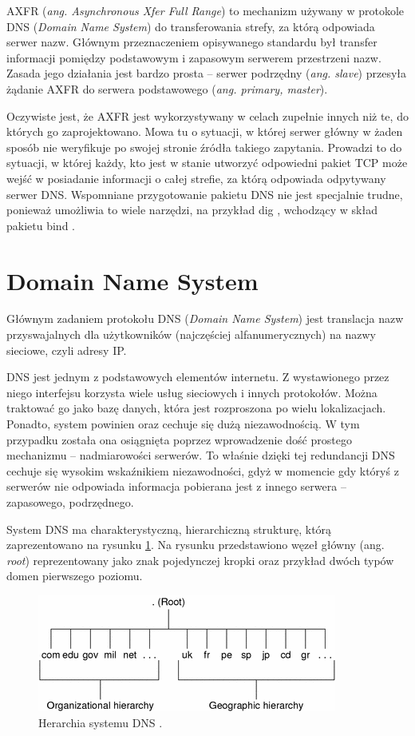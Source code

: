 AXFR (\textit{ang. Asynchronous Xfer Full Range}) \cite{RFC1034, RFC1035} to mechanizm używany w protokole DNS (\textit{Domain Name System}) do
transferowania strefy, za którą odpowiada serwer nazw. Głównym przeznaczeniem opisywanego standardu był transfer informacji pomiędzy
podstawowym i zapasowym serwerem przestrzeni nazw. Zasada jego działania jest bardzo prosta -- serwer podrzędny (\textit{ang. slave})
przesyła żądanie AXFR do serwera podstawowego (\textit{ang. primary, master}).

Oczywiste jest, że AXFR jest wykorzystywany w celach zupełnie innych niż te, do których go zaprojektowano. Mowa tu o sytuacji,
w której serwer główny w żaden sposób nie weryfikuje po swojej stronie źródła takiego zapytania. Prowadzi to do sytuacji, w której
każdy, kto jest w stanie utworzyć odpowiedni pakiet TCP może wejść w posiadanie informacji o całej strefie, za którą odpowiada
odpytywany serwer DNS. Wspomniane przygotowanie pakietu DNS nie jest specjalnie trudne, ponieważ umożliwia to wiele narzędzi, na
przykład dig \cite{dig}, wchodzący w skład pakietu bind \cite{isc}.

\section{Domain Name System}
\noindent Głównym zadaniem protokołu DNS (\textit{Domain Name System}) \cite{RFC1035} jest translacja nazw przyswajalnych dla użytkowników (najczęściej
alfanumerycznych) na nazwy sieciowe, czyli adresy IP.

DNS jest jednym z podstawowych elementów internetu. Z wystawionego przez niego interfejsu korzysta wiele usług sieciowych i innych
protokołów. Można traktować go jako bazę danych, która jest rozproszona po wielu lokalizacjach. Ponadto, system powinien oraz
cechuje się dużą niezawodnością. W tym przypadku została ona osiągnięta poprzez wprowadzenie dość prostego mechanizmu -- nadmiarowości
serwerów. To właśnie dzięki tej redundancji DNS cechuje się wysokim wskaźnikiem niezawodności, gdyż w momencie gdy któryś z serwerów
nie odpowiada informacja pobierana jest z innego serwera -- zapasowego, podrzędnego.

System DNS ma charakterystyczną, hierarchiczną strukturę, którą zaprezentowano na rysunku \ref{hierarchy_dns}. Na rysunku
przedstawiono węzeł główny (ang. \textit{root}) reprezentowany jako znak pojedynczej kropki oraz przykład dwóch typów domen
pierwszego poziomu.

\begin{center}
	\begin{figure}
	\includegraphics[scale=1]{image/hierarchy_dns}
	\caption{Herarchia systemu DNS \cite{hierarchy_dns}.}
	\label{hierarchy_dns}
	\end{figure}
\end{center}

